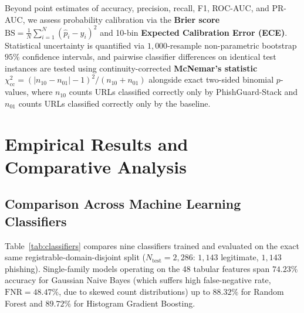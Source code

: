 \documentclass[conference]{IEEEtran}
\begin{document}
Beyond point estimates of accuracy, precision, recall, F1, ROC-AUC, and PR-AUC, we assess probability calibration via the \textbf{Brier score} $\text{BS} = \frac{1}{N}\sum_{i=1}^N (\hat{p}_i - y_i)^2$ and 10-bin \textbf{Expected Calibration Error (ECE)}. Statistical uncertainty is quantified via $1{,}000$-resample non-parametric bootstrap $95\%$ confidence intervals, and pairwise classifier differences on identical test instances are tested using continuity-corrected \textbf{McNemar's statistic} $\chi^2_{\text{cc}} = (|n_{10} - n_{01}| - 1)^2 / (n_{10} + n_{01})$ alongside exact two-sided binomial $p$-values, where $n_{10}$ counts URLs classified correctly only by PhishGuard-Stack and $n_{01}$ counts URLs classified correctly only by the baseline.

\section{Empirical Results and Comparative Analysis}
\label{sec:results}

\subsection{Comparison Across Machine Learning Classifiers}
Table~\ref{tab:classifiers} compares nine classifiers trained and evaluated on the exact same registrable-domain-disjoint split ($N_{\text{test}}=2{,}286$: $1{,}143$ legitimate, $1{,}143$ phishing). Single-family models operating on the 48 tabular features span $74.23\%$ accuracy for Gaussian Naive Bayes (which suffers high false-negative rate, $\text{FNR}=48.47\%$, due to skewed count distributions) up to $88.32\%$ for Random Forest and $89.72\%$ for Histogram Gradient Boosting.
\end{document}
